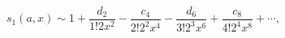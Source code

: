\[s_{1}(a,x)\sim 1+\frac{d_{2}}{1!2x^{2}}-\frac{c_{4}}{2!2^{2}x^{4}}-\frac{d_{6}%
}{3!2^{3}x^{6}}+\frac{c_{8}}{4!2^{4}x^{8}}+\cdots,\]